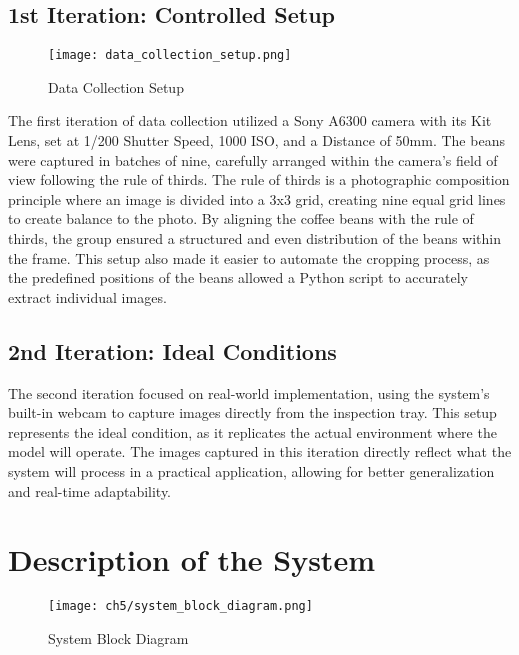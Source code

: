 \subsection{1st Iteration: Controlled Setup}
\begin{figure}[h]
    \centering
    \texttt{[image: data\_collection\_setup.png]}
    \caption{Data Collection Setup}
    \label{fig:data_collection_setup}
\end{figure}


The first iteration of data collection utilized a Sony A6300 camera with its Kit Lens, set at 1/200 Shutter Speed, 1000 ISO, and a Distance of 50mm. The beans were captured in batches of nine, carefully arranged within the camera's field of view following the rule of thirds. The rule of thirds is a photographic composition principle where an image is divided into a 3x3 grid, creating nine equal grid lines to create balance to the photo. By aligning the coffee beans with the rule of thirds, the group ensured a structured and even distribution of the beans within the frame. This setup also made it easier to automate the cropping process, as the predefined positions of the beans allowed a Python script to accurately extract individual images.

\subsection{2nd Iteration: Ideal Conditions}

The second iteration focused on real-world implementation, using the system's built-in webcam to capture images directly from the inspection tray. This setup represents the ideal condition, as it replicates the actual environment where the model will operate. The images captured in this iteration directly reflect what the system will process in a practical application, allowing for better generalization and real-time adaptability.

\section{Description of the System}

\begin{figure}[h]
    \centering
    \texttt{[image: ch5/system\_block\_diagram.png]}
    \caption{System Block Diagram}
    \label{fig:system_block_diagram}
\end{figure}

